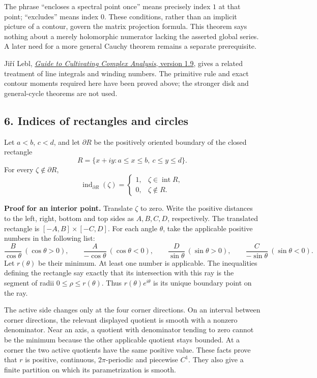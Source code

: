 \documentclass[
  11pt,
]{article}
\begin{document}
The phrase ``encloses a spectral point once'' means precisely index
\(1\) at that point; ``excludes'' means index \(0\). These conditions,
rather than an implicit picture of a contour, govern the matrix
projection formula. This theorem says nothing about a merely holomorphic
numerator lacking the asserted global series. A later need for a more
general Cauchy theorem remains a separate prerequisite.

Jiří Lebl,
\href{https://github.com/jirilebl/ca/blob/adfaaf8b13287185c22db079f16f39183628f482/ca.tex}{\emph{Guide
to Cultivating Complex Analysis}, version 1.9}, gives a related
treatment of line integrals and winding numbers. The primitive rule and
exact contour moments required here have been proved above; the stronger
disk and general-cycle theorems are not used.

\subsection{6. Indices of rectangles and
circles}\label{indices-of-rectangles-and-circles}

Let \(a<b\), \(c<d\), and let \(\partial R\) be the positively oriented
boundary of the closed rectangle \[
R=\{x+iy:a\leq x\leq b,\ c\leq y\leq d\}.
\] For every \(\zeta\notin\partial R\), \[
\operatorname{ind}_{\partial R}(\zeta)=
\begin{cases}
1,&\zeta\in\operatorname{int}R,\\
0,&\zeta\notin R.
\end{cases}
\]

\textbf{Proof for an interior point.} Translate \(\zeta\) to zero. Write
the positive distances to the left, right, bottom and top sides as
\(A,B,C,D\), respectively. The translated rectangle is
\([-A,B]\times[-C,D]\). For each angle \(\theta\), take the applicable
positive numbers in the following list: \[
\frac{B}{\cos\theta}\ (\cos\theta>0),\qquad
\frac{A}{-\cos\theta}\ (\cos\theta<0),\qquad
\frac{D}{\sin\theta}\ (\sin\theta>0),\qquad
\frac{C}{-\sin\theta}\ (\sin\theta<0).
\] Let \(r(\theta)\) be their minimum. At least one number is
applicable. The inequalities defining the rectangle say exactly that its
intersection with this ray is the segment of radii
\(0\leq\rho\leq r(\theta)\). Thus \(r(\theta)e^{i\theta}\) is its unique
boundary point on the ray.

The active side changes only at the four corner directions. On an
interval between corner directions, the relevant displayed quotient is
smooth with a nonzero denominator. Near an axis, a quotient with
denominator tending to zero cannot be the minimum because the other
applicable quotient stays bounded. At a corner the two active quotients
have the same positive value. These facts prove that \(r\) is positive,
continuous, \(2\pi\)-periodic and piecewise \(C^1\). They also give a
finite partition on which its parametrization is smooth.
\end{document}
